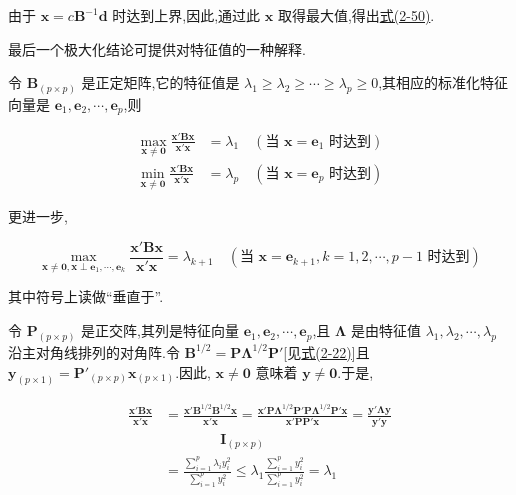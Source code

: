 
由于 $\bm{x} = c\bm{B}^{-1}\bm{d}$ 时达到上界,因此,通过此 $\bm{x}$ 取得最大值,得出\hyperref[eq:2-50]{式(2-50)}.

最后一个极大化结论可提供对特征值的一种解释.

 令 $\bm{B}_{(p \times p)}$ 是正定矩阵,它的特征值是 $\lambda_1 \geqslant \lambda_2 \geqslant \cdots \geqslant \lambda_p \geqslant 0$,其相应的标准化特征向量是 $\bm{e}_1, \bm{e}_2, \cdots, \bm{e}_p$,则

\label{eq:2-51}
\begin{equation}
\begin{aligned}
\max_{\bm{x} \neq \bm{0}} \frac{\bm{x}'\bm{B}\bm{x}}{\bm{x}'\bm{x}} &= \lambda_1 \quad (\text{当 } \bm{x} = \bm{e}_1 \text{ 时达到}) \\
\min_{\bm{x} \neq \bm{0}} \frac{\bm{x}'\bm{B}\bm{x}}{\bm{x}'\bm{x}} &= \lambda_p \quad (\text{当 } \bm{x} = \bm{e}_p \text{ 时达到})
\end{aligned} \tag{2-51}
\end{equation}

更进一步,

\label{eq:2-52}
\begin{equation}
\max_{\bm{x} \neq \bm{0}, \bm{x} \perp \bm{e}_1, \cdots, \bm{e}_k} \frac{\bm{x}'\bm{B}\bm{x}}{\bm{x}'\bm{x}} = \lambda_{k+1} \quad (\text{当 } \bm{x} = \bm{e}_{k+1}, k = 1, 2, \cdots, p - 1 \text{ 时达到}) \tag{2-52}
\end{equation}

其中符号上读做“垂直于”.

 令 $\bm{P}_{(p \times p)}$ 是正交阵,其列是特征向量 $\bm{e}_1, \bm{e}_2, \cdots, \bm{e}_p$,且 $\bm{\Lambda}$ 是由特征值 $\lambda_1, \lambda_2, \cdots, \lambda_p$ 沿主对角线排列的对角阵.令 $\bm{B}^{1/2} = \bm{P}\bm{\Lambda}^{1/2}\bm{P}'$[见\hyperref[eq:2-22]{式(2-22)}]且 $\bm{y}_{(p \times 1)} = \bm{P}'_{(p \times p)}\bm{x}_{(p \times 1)}$.因此, $\bm{x} \neq \bm{0}$ 意味着 $\bm{y} \neq \bm{0}$.于是,

\label{eq:2-53}
\begin{equation}
\begin{aligned}
\frac{\bm{x}'\bm{B}\bm{x}}{\bm{x}'\bm{x}} &= \frac{\bm{x}'\bm{B}^{1/2}\bm{B}^{1/2}\bm{x}}{\bm{x}'\bm{x}} = \frac{\bm{x}'\bm{P}\bm{\Lambda}^{1/2}\bm{P}'\bm{P}\bm{\Lambda}^{1/2}\bm{P}'\bm{x}}{\bm{x}'\bm{P}\bm{P}'\bm{x}} = \frac{\bm{y}'\bm{\Lambda}\bm{y}}{\bm{y}'\bm{y}} \\
&\qquad\qquad \bm{I}_{(p \times p)} \\
&= \frac{\sum_{i=1}^{p}\lambda_i y_i^2}{\sum_{i=1}^{p}y_i^2} \leqslant \lambda_1 \frac{\sum_{i=1}^{p}y_i^2}{\sum_{i=1}^{p}y_i^2} = \lambda_1
\end{aligned} \tag{2-53}
\end{equation}

